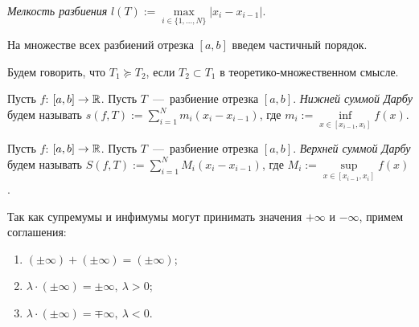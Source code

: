 \begin{definition}
    \textit{Мелкость разбиения} $l(T) := \max\limits_{i \in \{1, \dots, N\}} |x_i - x_{i - 1}|$.
\end{definition}

\noindent На множестве всех разбиений отрезка $[a, b]$ введем частичный порядок. 

\begin{definition}
Будем говорить, что $T_1 \succcurlyeq T_2$, если $T_2 \subset T_1$ в теоретико-множественном смысле.
\end{definition}

\begin{definition}
    Пусть $f$: $[a, b] \rightarrow \mathbb{R}$. Пусть $T$~---~разбиение отрезка $[a, b]$. \textit{Нижней суммой Дарбу} будем называть $s(f, T) := \sum \limits_{i = 1}^N m_i(x_i - x_{i - 1})$, где $m_i := \inf \limits_{x \in [x_{i - 1}, x_i]} f(x)$.
\end{definition}

\begin{definition}
     Пусть $f$: $[a, b] \rightarrow \mathbb{R}$. Пусть $T$~---~разбиение отрезка $[a, b]$. \textit{Верхней суммой Дарбу} будем называть $S(f, T) := \sum \limits_{i = 1}^N M_i(x_i - x_{i - 1})$, где $M_i := \sup \limits_{x \in [x_{i - 1}, x_i]} f(x)$.
\end{definition}
\noindent Так как супремумы и инфимумы могут принимать значения $+ \infty$ и  $-\infty$, примем соглашения: 
\begin{enumerate}
    \item $(\pm \infty) + (\pm \infty) = (\pm \infty)$;
    \item $ \lambda \cdot (\pm \infty) = \pm \infty, \ \lambda > 0$;
    \item $ \lambda \cdot (\pm \infty) = \mp \infty, \ \lambda < 0$.
\end{enumerate}


